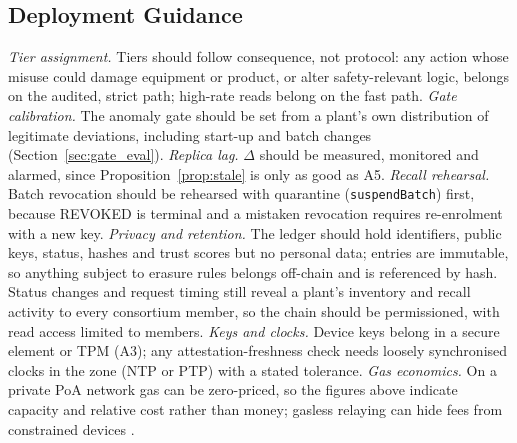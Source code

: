\subsection{Deployment Guidance}
\emph{Tier assignment.} Tiers should follow consequence, not protocol: any action whose misuse could damage equipment or product, or alter safety-relevant logic, belongs on the audited, strict path; high-rate reads belong on the fast path. \emph{Gate calibration.} The anomaly gate should be set from a plant's own distribution of legitimate deviations, including start-up and batch changes (Section~\ref{sec:gate_eval}). \emph{Replica lag.} $\Delta$ should be measured, monitored and alarmed, since Proposition~\ref{prop:stale} is only as good as A5. \emph{Recall rehearsal.} Batch revocation should be rehearsed with quarantine (\texttt{suspendBatch}) first, because REVOKED is terminal and a mistaken revocation requires re-enrolment with a new key. \emph{Privacy and retention.} The ledger should hold identifiers, public keys, status, hashes and trust scores but no personal data; entries are immutable, so anything subject to erasure rules belongs off-chain and is referenced by hash. Status changes and request timing still reveal a plant's inventory and recall activity to every consortium member, so the chain should be permissioned, with read access limited to members. \emph{Keys and clocks.} Device keys belong in a secure element or TPM (A3); any attestation-freshness check needs loosely synchronised clocks in the zone (NTP or PTP) with a stated tolerance. \emph{Gas economics.} On a private PoA network gas can be zero-priced, so the figures above indicate capacity and relative cost rather than money; gasless relaying can hide fees from constrained devices \cite{madhwal2025gasless}.

